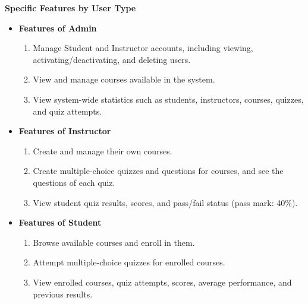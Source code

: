 \documentclass[11pt,a4paper]{article}
\begin{document}
{{\textbf{Specific Features by User Type}
\begin{itemize}[leftmargin=2.2em, itemsep=6pt, topsep=2pt]
  \item \textbf{Features of Admin}
  \begin{enumerate}[leftmargin=2.2em, itemsep=0pt, topsep=4pt]
    \item Manage Student and Instructor accounts, including viewing, activating/deactivating, and deleting users.
    \item View and manage courses available in the system.
    \item View system-wide statistics such as students, instructors, courses, quizzes, and quiz attempts.
  \end{enumerate}
  \item \textbf{Features of Instructor}
  \begin{enumerate}[leftmargin=2.2em, itemsep=0pt, topsep=4pt]
    \item Create and manage their own courses.
    \item Create multiple-choice quizzes and questions for courses, and see the questions of each quiz.
    \item View student quiz results, scores, and pass/fail status (pass mark: 40\%).
  \end{enumerate}
  \item \textbf{Features of Student}
  \begin{enumerate}[leftmargin=2.2em, itemsep=0pt, topsep=4pt]
    \item Browse available courses and enroll in them.
    \item Attempt multiple-choice quizzes for enrolled courses.
    \item View enrolled courses, quiz attempts, scores, average performance, and previous results.
  \end{enumerate}
\end{itemize}
\vspace{6pt}}}
\end{document}
